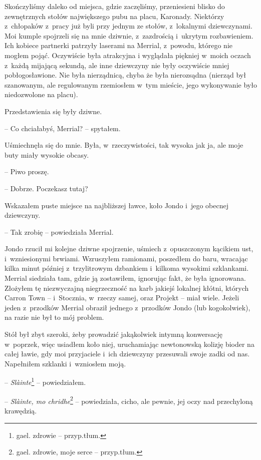 \documentclass[oneside,polish,11pt,sfheadings]{mwbk}
\begin{document}
Skończyliśmy daleko od miejsca, gdzie zaczęliśmy, przeniesieni blisko do
zewnętrznych stołów największego pubu na placu, Karonady. Niektórzy z~chłopaków z~pracy już byli przy jednym ze stołów, z~lokalnymi
dziewczynami. Moi kumple spojrzeli się na mnie dziwnie, z~zazdrością i~ukrytym rozbawieniem. Ich kobiece partnerki patrzyły laserami na
Merrial, z~powodu, którego nie mogłem pojąć. Oczywiście była atrakcyjna
i wyglądała piękniej w~moich oczach z~każdą mijającą sekundą, ale inne
dziewczyny nie były oczywiście mniej pobłogosławione. Nie była
nierządnicą, chyba że była nierozsądna (nierząd był szanowanym, ale
regulowanym rzemiosłem w~tym mieście, jego wykonywanie było niedozwolone
na placu).

Przedstawienia się były dziwne.

-- Co chciałabyś, Merrial? -- spytałem.

Uśmiechnęła się do mnie. Była, w~rzeczywistości, tak wysoka jak ja, ale
moje buty miały wysokie obcasy.

-- Piwo proszę.

-- Dobrze. Poczekasz tutaj?

Wskazałem puste miejsce na najbliższej ławce, koło Jondo i~jego obecnej
dziewczyny.

-- Tak zrobię -- powiedziała Merrial.

Jondo rzucił mi kolejne dziwne spojrzenie, uśmiech z~opuszczonym
kącikiem ust, i~wzniesionymi brwiami. Wzruszyłem ramionami, poszedłem do
baru, wracając kilka minut później z~trzylitrowym dzbankiem i~kilkoma
wysokimi szklankami. Merrial siedziała tam, gdzie ją zostawiłem,
ignorując fakt, że była ignorowana. Złożyłem tę niezwyczajną
niegrzeczność na karb jakiejś lokalnej kłótni, których Carron Town -- i~Stocznia, w~rzeczy samej, oraz Projekt -- miał wiele. Jeżeli jeden z~przodków Merrial obraził jednego z~przodków Jondo (lub kogokolwiek), na
razie nie był to mój problem.

Stół był zbyt szeroki, żeby prowadzić jakąkolwiek intymną konwersację w~poprzek, więc usiadłem koło niej, uruchamiając newtonowską kolizję
bioder na całej ławie, gdy moi przyjaciele i~ich dziewczyny przesuwali
swoje zadki od nas. Napełniłem szklanki i~wzniosłem moją.

-- \textit{Slàinte}\footnote{gael. zdrowie -- przyp.tłum.} -- powiedziałem.

-- \textit{Slàinte, mo chridhe}\footnote{gael. zdrowie, moje serce -- przyp.tłum.} -- powiedziała, cicho, ale pewnie, jej oczy nad przechyloną
krawędzią.
\end{document}

